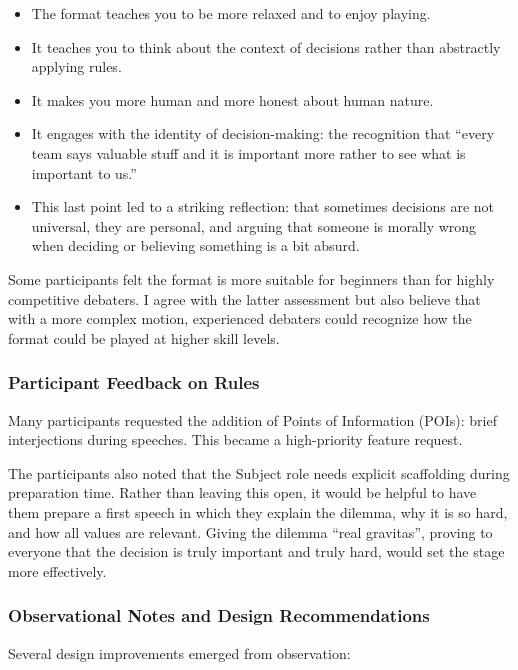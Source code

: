 \begin{itemize}
    \item The format teaches you to be more relaxed and to enjoy playing.
    \item It teaches you to think about the context of decisions rather than abstractly applying rules.
    \item It makes you more human and more honest about human nature.
    \item It engages with the identity of decision-making: the recognition that ``every team says valuable stuff and it is important more rather to see what is important to us.''
    \item This last point led to a striking reflection: that sometimes decisions are not universal, they are personal, and arguing that someone is morally wrong when deciding or believing something is a bit absurd.
\end{itemize}

Some participants felt the format is more suitable for beginners than for highly competitive debaters. I agree with the latter assessment but also believe that with a more complex motion, experienced debaters could recognize how the format could be played at higher skill levels.

\subsubsection{Participant Feedback on Rules}

Many participants requested the addition of Points of Information (POIs): brief interjections during speeches. This became a high-priority feature request.

The participants also noted that the Subject role needs explicit scaffolding during preparation time. Rather than leaving this open, it would be helpful to have them prepare a first speech in which they explain the dilemma, why it is so hard, and how all values are relevant. Giving the dilemma ``real gravitas'', proving to everyone that the decision is truly important and truly hard, would set the stage more effectively.

\subsubsection{Observational Notes and Design Recommendations}

Several design improvements emerged from observation:

